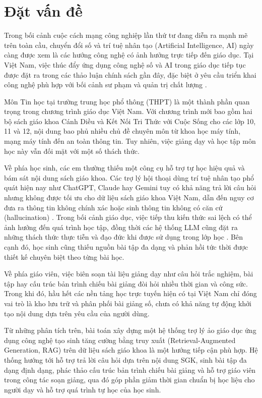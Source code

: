 \documentclass[../DoAn.tex]{subfiles}
\begin{document}
\section{Đặt vấn đề}
\label{section:1.1}

Trong bối cảnh cuộc cách mạng công nghiệp lần thứ tư đang diễn ra mạnh mẽ trên toàn cầu, chuyển đổi số và trí tuệ nhân tạo (Artificial Intelligence, AI) ngày càng được xem là các hướng công nghệ có ảnh hưởng trực tiếp đến giáo dục. Tại Việt Nam, việc thúc đẩy ứng dụng công nghệ số và AI trong giáo dục tiếp tục được đặt ra trong các thảo luận chính sách gần đây, đặc biệt ở yêu cầu triển khai công nghệ phù hợp với bối cảnh sư phạm và quản trị chất lượng \cite{baochinhphu2026_ai_giaoduc}.

Môn Tin học tại trường trung học phổ thông (THPT) là một thành phần quan trọng trong chương trình giáo dục Việt Nam. Với chương trình mới bao gồm hai bộ sách giáo khoa Cánh Diều và Kết Nối Tri Thức với Cuộc Sống cho các lớp 10, 11 và 12, nội dung bao phủ nhiều chủ đề chuyên môn từ khoa học máy tính, mạng máy tính đến an toàn thông tin. Tuy nhiên, việc giảng dạy và học tập môn học này vẫn đối mặt với một số thách thức.

Về phía học sinh, các em thường thiếu một công cụ hỗ trợ tự học hiệu quả và bám sát nội dung sách giáo khoa. Các trợ lý hội thoại dùng trí tuệ nhân tạo phổ quát hiện nay như ChatGPT, Claude hay Gemini tuy có khả năng trả lời câu hỏi nhưng không được tối ưu cho dữ liệu sách giáo khoa Việt Nam, dẫn đến nguy cơ đưa ra thông tin không chính xác hoặc sinh thông tin không có căn cứ (hallucination) \cite{ji2023hallucination}. Trong bối cảnh giáo dục, việc tiếp thu kiến thức sai lệch có thể ảnh hưởng đến quá trình học tập, đồng thời các hệ thống LLM cũng đặt ra những thách thức thực tiễn và đạo đức khi được sử dụng trong lớp học \cite{yan2024llm_edu}. Bên cạnh đó, học sinh cũng thiếu nguồn bài tập đa dạng và phản hồi tức thời được thiết kế chuyên biệt theo từng bài học.

Về phía giáo viên, việc biên soạn tài liệu giảng dạy như câu hỏi trắc nghiệm, bài tập hay cấu trúc bản trình chiếu bài giảng đòi hỏi nhiều thời gian và công sức. Trong khi đó, hầu hết các nền tảng học trực tuyến hiện có tại Việt Nam chỉ đóng vai trò là kho lưu trữ và phân phối bài giảng số, chưa có khả năng tự động khởi tạo nội dung dựa trên yêu cầu của người dùng.

Từ những phân tích trên, bài toán xây dựng một hệ thống trợ lý ảo giáo dục ứng dụng công nghệ tạo sinh tăng cường bằng truy xuất (Retrieval-Augmented Generation, RAG) trên dữ liệu sách giáo khoa là một hướng tiếp cận phù hợp. Hệ thống hướng tới hỗ trợ trả lời câu hỏi dựa trên nội dung SGK, sinh bài tập đa dạng định dạng, phác thảo cấu trúc bản trình chiếu bài giảng và hỗ trợ giáo viên trong công tác soạn giảng, qua đó góp phần giảm thời gian chuẩn bị học liệu cho người dạy và hỗ trợ quá trình tự học của học sinh.
\end{document}
